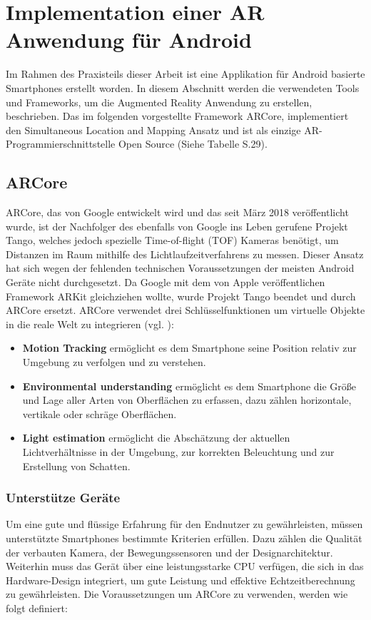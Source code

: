 \chapter{Implementation einer AR Anwendung für Android}
Im Rahmen des Praxisteils dieser Arbeit ist eine Applikation für Android basierte Smartphones erstellt worden. In diesem Abschnitt werden die verwendeten Tools und Frameworks, um die Augmented Reality Anwendung zu erstellen, beschrieben. Das im folgenden vorgestellte Framework ARCore, implementiert den Simultaneous Location and Mapping Ansatz und ist als einzige AR-Programmierschnittstelle Open Source (Siehe Tabelle S.29).



\section{ARCore}
ARCore, das von Google entwickelt wird und das seit März 2018 veröffentlicht wurde, ist der Nachfolger des ebenfalls von Google ins Leben gerufene Projekt Tango, welches jedoch spezielle \glqq Time-of-flight\grqq{} (TOF) Kameras benötigt, um Distanzen im Raum mithilfe des Lichtlaufzeitverfahrens zu messen. Dieser Ansatz hat sich wegen der fehlenden technischen Voraussetzungen der meisten Android Geräte nicht durchgesetzt. Da Google mit dem von Apple veröffentlichen Framework ARKit gleichziehen wollte, wurde Projekt Tango beendet und durch ARCore ersetzt. ARCore verwendet drei Schlüsselfunktionen um virtuelle Objekte in die reale Welt zu integrieren (vgl. \cite{arcore}):

\begin{itemize}
\item \textbf{Motion Tracking} ermöglicht es dem Smartphone seine Position relativ zur Umgebung zu verfolgen und zu verstehen.

\item \textbf{Environmental understanding} ermöglicht es dem Smartphone die Größe und Lage aller Arten von Oberflächen  zu erfassen, dazu zählen horizontale, vertikale oder schräge Oberflächen.

\item \textbf{Light estimation} ermöglicht die Abschätzung der aktuellen Lichtverhältnisse in der Umgebung, zur korrekten Beleuchtung und zur Erstellung von Schatten.
\end{itemize}

\subsection{Unterstütze Geräte}
Um eine gute und flüssige Erfahrung für den Endnutzer zu gewährleisten, müssen unterstützte Smartphones bestimmte Kriterien erfüllen. Dazu zählen die Qualität der verbauten Kamera, der Bewegungssensoren und der Designarchitektur. Weiterhin muss das Gerät über eine leistungsstarke CPU verfügen, die sich in das Hardware-Design integriert, um gute Leistung und effektive Echtzeitberechnung zu gewährleisten. Die Voraussetzungen um ARCore zu verwenden, werden wie folgt definiert:

